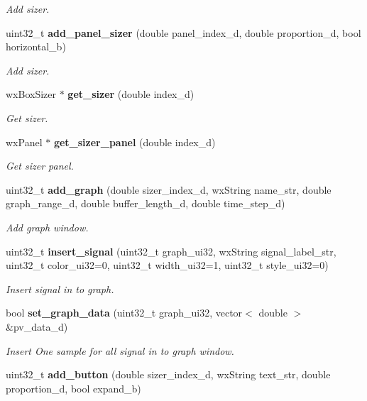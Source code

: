 \begin{DoxyCompactItemize}
\begin{DoxyCompactList}\small\item\em Add sizer. \end{DoxyCompactList}\item 
uint32\+\_\+t \textbf{ add\+\_\+panel\+\_\+sizer} (double panel\+\_\+index\+\_\+d, double proportion\+\_\+d, bool horizontal\+\_\+b)
\begin{DoxyCompactList}\small\item\em Add sizer. \end{DoxyCompactList}\item 
wx\+Box\+Sizer $\ast$ \textbf{ get\+\_\+sizer} (double index\+\_\+d)
\begin{DoxyCompactList}\small\item\em Get sizer. \end{DoxyCompactList}\item 
wx\+Panel $\ast$ \textbf{ get\+\_\+sizer\+\_\+panel} (double index\+\_\+d)
\begin{DoxyCompactList}\small\item\em Get sizer panel. \end{DoxyCompactList}\item 
uint32\+\_\+t \textbf{ add\+\_\+graph} (double sizer\+\_\+index\+\_\+d, wx\+String name\+\_\+str, double graph\+\_\+range\+\_\+d, double buffer\+\_\+length\+\_\+d, double time\+\_\+step\+\_\+d)
\begin{DoxyCompactList}\small\item\em Add graph window. \end{DoxyCompactList}\item 
uint32\+\_\+t \textbf{ insert\+\_\+signal} (uint32\+\_\+t graph\+\_\+ui32, wx\+String signal\+\_\+label\+\_\+str, uint32\+\_\+t color\+\_\+ui32=0, uint32\+\_\+t width\+\_\+ui32=1, uint32\+\_\+t style\+\_\+ui32=0)
\begin{DoxyCompactList}\small\item\em Insert signal in to graph. \end{DoxyCompactList}\item 
bool \textbf{ set\+\_\+graph\+\_\+data} (uint32\+\_\+t graph\+\_\+ui32, vector$<$ double $>$ \&pv\+\_\+data\+\_\+d)
\begin{DoxyCompactList}\small\item\em Insert One sample for all signal in to graph window. \end{DoxyCompactList}\item 
uint32\+\_\+t \textbf{ add\+\_\+button} (double sizer\+\_\+index\+\_\+d, wx\+String text\+\_\+str, double proportion\+\_\+d, bool expand\+\_\+b)

\end{DoxyCompactItemize}
